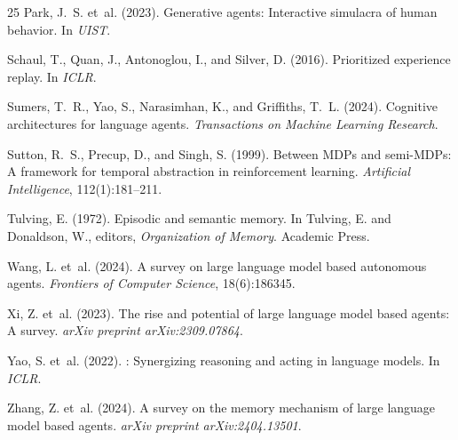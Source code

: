 \documentclass[letterpaper]{article}
\begin{document}
\begin{thebibliography}{25}
Park, J.~S. et~al. (2023).
\newblock Generative agents: Interactive simulacra of human behavior.
\newblock In \emph{UIST}.

Schaul, T., Quan, J., Antonoglou, I., and Silver, D. (2016).
\newblock Prioritized experience replay.
\newblock In \emph{ICLR}.

Sumers, T.~R., Yao, S., Narasimhan, K., and Griffiths, T.~L. (2024).
\newblock Cognitive architectures for language agents.
\newblock \emph{Transactions on Machine Learning Research}.

Sutton, R.~S., Precup, D., and Singh, S. (1999).
\newblock Between {MDP}s and semi-{MDP}s: A framework for temporal abstraction in reinforcement learning.
\newblock \emph{Artificial Intelligence}, 112(1):181--211.

Tulving, E. (1972).
\newblock Episodic and semantic memory.
\newblock In Tulving, E. and Donaldson, W., editors, \emph{Organization of Memory}. Academic Press.

Wang, L. et~al. (2024).
\newblock A survey on large language model based autonomous agents.
\newblock \emph{Frontiers of Computer Science}, 18(6):186345.

Xi, Z. et~al. (2023).
\newblock The rise and potential of large language model based agents: A survey.
\newblock \emph{arXiv preprint arXiv:2309.07864}.

Yao, S. et~al. (2022).
: Synergizing reasoning and acting in language models.
\newblock In \emph{ICLR}.

Zhang, Z. et~al. (2024).
\newblock A survey on the memory mechanism of large language model based agents.
\newblock \emph{arXiv preprint arXiv:2404.13501}.

\end{thebibliography}
\end{document}
